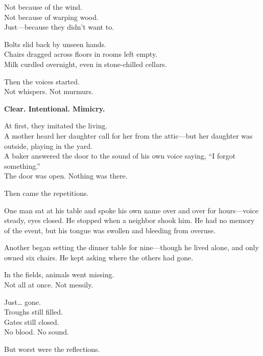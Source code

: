\documentclass[9pt]{article}
\begin{document}
\vspace{0.5em}
Not because of the wind.\\
Not because of warping wood.\\
Just---because they didn’t want to.

\vspace{0.5em}
Bolts slid back by unseen hands.\\
Chairs dragged across floors in rooms left empty.\\
Milk curdled overnight, even in stone-chilled cellars.

\vspace{0.5em}
Then the voices started.\\
Not whispers. Not murmurs.

\vspace{0.5em}
\textbf{Clear. Intentional. Mimicry.}

\vspace{0.5em}
At first, they imitated the living.\\
A mother heard her daughter call for her from the attic---but her daughter was outside, playing in the yard.\\
A baker answered the door to the sound of his own voice saying, ``I forgot something.''\\
The door was open. Nothing was there.

\vspace{0.5em}
Then came the repetitions.

\vspace{0.5em}
One man sat at his table and spoke his own name over and over for hours---voice steady, eyes closed. He stopped when a neighbor shook him. He had no memory of the event, but his tongue was swollen and bleeding from overuse.

\vspace{0.5em}
Another began setting the dinner table for nine---though he lived alone, and only owned six chairs. He kept asking where the others had gone.

\vspace{0.5em}
In the fields, animals went missing.\\
Not all at once. Not messily.

\vspace{0.5em}
Just\ldots{} gone.\\
Troughs still filled.\\
Gates still closed.\\
No blood. No sound.

\vspace{0.5em}
But worst were the reflections.
\end{document}
